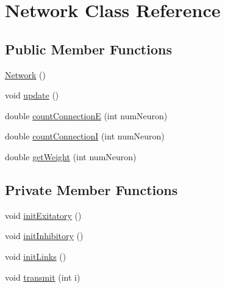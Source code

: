 \hypertarget{classNetwork}{\section{Network Class Reference}
\label{classNetwork}
}
\subsection*{Public Member Functions}
\begin{DoxyCompactItemize}
\item 
\hyperlink{classNetwork_a3cc2fb4f8fa4d507077e8da85ce5a1c8}{Network} ()
\item 
void \hyperlink{classNetwork_ab07bb6f6d9020b9eb230551083ea929f}{update} ()
\item 
double \hyperlink{classNetwork_a6bdbcfb84eeba497bcab661f39d7bc6f}{count\-Connection\-E} (int num\-Neuron)
\item 
double \hyperlink{classNetwork_a60b033c815f3685e6fc3bb0cf244a06a}{count\-Connection\-I} (int num\-Neuron)
\item 
double \hyperlink{classNetwork_ad214f401b7ddf102fb574fbd050bf7de}{get\-Weight} (int num\-Neuron)
\end{DoxyCompactItemize}
\subsection*{Private Member Functions}
\begin{DoxyCompactItemize}
\item 
void \hyperlink{classNetwork_a6660b0fe73afa5bf261a5bcc6f6f81d8}{init\-Exitatory} ()
\item 
void \hyperlink{classNetwork_aa2cc8747377851de3fc53a5ab7d7bf54}{init\-Inhibitory} ()
\item 
void \hyperlink{classNetwork_a82eecc52e44648d2f43d5380a19bcc0c}{init\-Links} ()
\item 
void \hyperlink{classNetwork_a7441f70fb101865b0ea475e149229edc}{transmit} (int i)
\end{DoxyCompactItemize}
